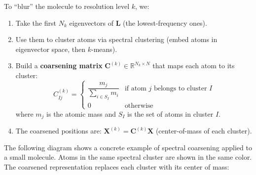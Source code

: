 \documentclass[12pt,a4paper]{article}
\newcommand{\R}{\mathbb{R}}
\begin{document}
To ``blur'' the molecule to resolution level $k$, we:

\begin{enumerate}
  \item Take the first $N_k$ eigenvectors of $\bm{L}$ (the lowest-frequency ones).
  \item Use them to cluster atoms via spectral clustering (embed atoms in eigenvector space, then $k$-means).
  \item Build a \textbf{coarsening matrix} $\bm{C}^{(k)} \in \R^{N_k \times N}$ that maps each atom to its cluster:
  \[
  C^{(k)}_{Ij} = \begin{cases}
    \dfrac{m_j}{\sum_{i \in S_I} m_i} & \text{if atom } j \text{ belongs to cluster } I \\
    0 & \text{otherwise}
  \end{cases}
  \]
  where $m_j$ is the atomic mass and $S_I$ is the set of atoms in cluster $I$.
  \item The coarsened positions are: $\bm{X}^{(k)} = \bm{C}^{(k)} \bm{X}$ (center-of-mass of each cluster).
\end{enumerate}

The following diagram shows a concrete example of spectral coarsening applied to a small molecule. Atoms in the same spectral cluster are shown in the same color. The coarsened representation replaces each cluster with its center of mass:
\end{document}
